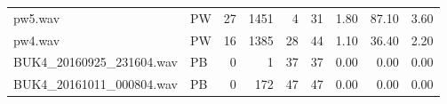 \begin{table}
\begin{tabular}{llrrrrrrl}
pw5.wav                   &     PW &   27 &  1451 &    4 &                  31 &       1.80 &   87.10 &            3.60 \\
pw4.wav                   &     PW &   16 &  1385 &   28 &                  44 &       1.10 &   36.40 &            2.20 \\
BUK4_20160925_231604.wav  &     PB &    0 &     1 &   37 &                  37 &       0.00 &    0.00 &            0.00 \\
BUK4_20161011_000804.wav  &     PB &    0 &   172 &   47 &                  47 &       0.00 &    0.00 &            0.00 \\
\bottomrule
\end{tabular}
\end{table}
